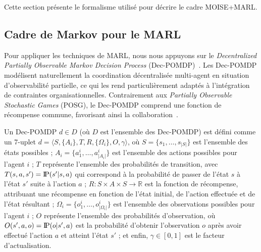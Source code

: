 \documentclass[final]{jfsma}
\newcommand{\probP}{\text{I\kern-0.15em P}}
\begin{document}
Cette section présente le formalisme utilisé pour décrire le cadre MOISE+MARL.

\subsection{Cadre de Markov pour le MARL}

Pour appliquer les techniques de MARL, nous nous appuyons sur le \textit{Decentralized Partially Observable Markov Decision Process} (Dec-POMDP)~\cite{Oliehoek2016}. Les Dec-POMDP modélisent naturellement la coordination décentralisée multi-agent en situation d'observabilité partielle, ce qui les rend particulièrement adaptés à l'intégration de contraintes organisationnelles. Contrairement aux \textit{Partially Observable Stochastic Games} (POSG), le Dec-POMDP comprend une fonction de récompense commune, favorisant ainsi la collaboration~\cite{Beynier2013}.

Un Dec-POMDP $d \in D$ (où $D$ est l'ensemble des Dec-POMDP) est défini comme un 7-uplet
$d = \langle S, \{A_i\}, T, R, \{\Omega_i\}, O, \gamma \rangle$,
où
\(S = \{s_1,\dots,s_{|S|}\}\) est l'ensemble des états possibles ; \quad
\(A_i = \{a_{1}^{i},\dots,a_{|A_i|}^{i}\}\) est l'ensemble des actions possibles pour l'agent \(i\) ; \quad
\(T\) représente l'ensemble des probabilités de transition, avec \(T(s,a,s') = \probP(s'|s,a)\) qui correspond à la probabilité de passer de l'état \(s\) à l'état \(s'\) suite à l'action \(a\) ; \quad
\(R : S \times A \times S \rightarrow \mathbb{R}\) est la fonction de récompense, attribuant une récompense en fonction de l'état initial, de l'action effectuée et de l'état résultant ; \quad
\(\Omega_i = \{o_{1}^{i},\dots,o_{|\Omega_i|}^{i}\}\) est l'ensemble des observations possibles pour l'agent \(i\) ; \quad
\(O\) représente l'ensemble des probabilités d'observation, où \(O(s',a,o) = \probP(o|s',a)\) est la probabilité d'obtenir l'observation \(o\) après avoir effectué l'action \(a\) et atteint l'état \(s'\) ; \quad et enfin, \(\gamma \in [0,1]\) est le facteur d'actualisation.
\end{document}
